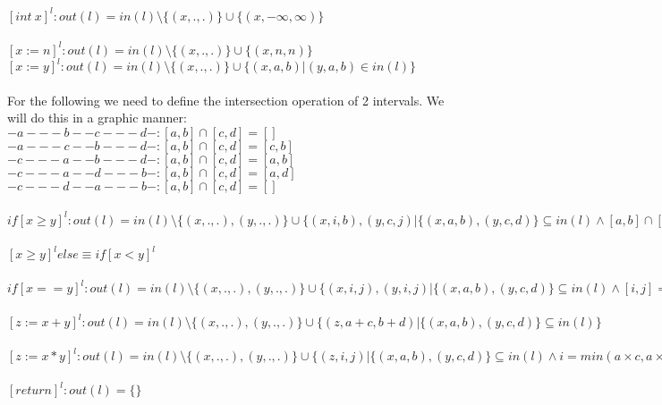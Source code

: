 $ [int\ x]^l : out(l) = in(l) \setminus \{ (x,.,.) \} \cup \{ (x,-\infty,\infty) \} $\\\\
$ [x := n]^l : out(l) = in(l) \setminus \{ (x,.,.) \} \cup \{ (x,n,n) \} $\\
$ [x := y]^l : out(l) = in(l) \setminus \{ (x,.,.) \} \cup \{ (x,a,b) | (y,a,b) \in in(l)\} $\\\\
For the following we need to define the intersection operation of 2 intervals. We will do this in a graphic manner:\\
$-a---b--c---d- : [a,b] \cap [c,d] = [] $\\
$-a---c--b---d- : [a,b] \cap [c,d] = [c,b] $\\
$-c---a--b---d- : [a,b] \cap [c,d] = [a,b] $\\
$-c---a--d---b- : [a,b] \cap [c,d] = [a,d] $\\
$-c---d--a---b- : [a,b] \cap [c,d] = [] $\\\\
$if [x \geq y]^l : out(l) = in(l) \setminus \{ (x,.,.),(y,.,.) \} \cup \{ (x,i,b) , (y,c,j) | \{(x,a,b),(y,c,d)\} \subseteq in(l) \wedge [a,b] \cap [c,d] \neq \{\} \wedge i = max(a,c) \wedge j = min(d,b)\} $\\\\
$[x \geq y]^l else \equiv if [x < y]^l $\\\\
$if [x == y]^l : out(l) = in(l) \setminus \{ (x,.,.),(y,.,.) \} \cup \{ (x,i,j) , (y,i,j) | \{(x,a,b),(y,c,d)\} \subseteq in(l) \wedge [i,j] = [a,b] \cap [c,d] \} $\\\\
$[z := x + y]^l : out(l) = in(l) \setminus \{ (x,.,.),(y,.,.) \} \cup \{ (z,a+c,b+d) | \{(x,a,b),(y,c,d)\} \subseteq in(l) \} $\\\\
$[z := x * y]^l : out(l) = in(l) \setminus \{ (x,.,.),(y,.,.) \} \cup \{ (z,i,j) | \{(x,a,b),(y,c,d)\} \subseteq in(l) \wedge i = min(a \times c,a \times d, b \times x, b \times d) \wedge j = max(a \times c,a \times d, b \times x, b \times d) \} $\\\\
$ [return]^l : out(l) = \{ \} $\\\\